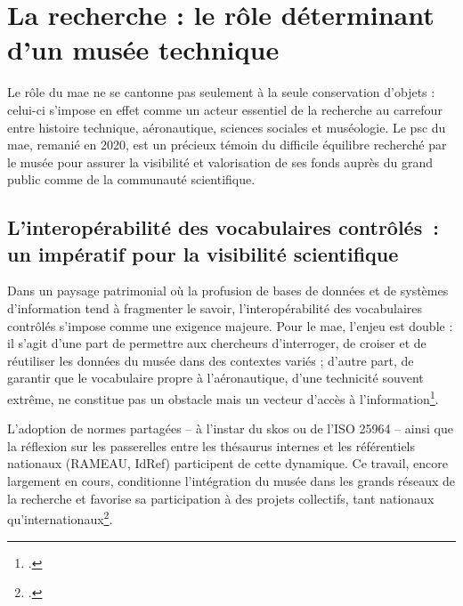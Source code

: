 \section{\label{I-A-2}La recherche : le rôle déterminant d'un musée technique}


%
%
%


Le rôle du \ac{mae} ne se cantonne pas seulement à la seule conservation d’objets : celui-ci s'impose en effet comme un acteur essentiel de la recherche au carrefour entre histoire technique, aéronautique, sciences sociales et muséologie.  Le \ac{psc} du \acf{mae}, remanié en 2020, est un précieux témoin du difficile équilibre recherché par le musée pour assurer la visibilité et valorisation de ses fonds auprès du grand public comme de la communauté scientifique.

\subsection{L’interopérabilité des vocabulaires contrôlés : un impératif pour la visibilité scientifique}

Dans un paysage patrimonial où la profusion de bases de données et de systèmes d’information tend à fragmenter le savoir, l’interopérabilité des vocabulaires contrôlés s’impose comme une exigence majeure. Pour le \ac{mae}, l’enjeu est double : il s’agit d’une part de permettre aux chercheurs d’interroger, de croiser et de réutiliser les données du musée dans des contextes variés ; d’autre part, de garantir que le vocabulaire propre à l’aéronautique, d’une technicité souvent extrême, ne constitue pas un obstacle mais un vecteur d’accès à l’information\footcite{hudonISO25964Pour2012a,chichereauNormesConceptionGestion2007}. 

L’adoption de normes partagées – à l’instar du \ac{skos} ou de l’ISO 25964 – ainsi que la réflexion sur les passerelles entre les thésaurus internes et les référentiels nationaux (RAMEAU, IdRef) participent de cette dynamique. Ce travail, encore largement en cours, conditionne l’intégration du musée dans les grands réseaux de la recherche et favorise sa participation à des projets collectifs, tant nationaux qu’internationaux\footcite{nouvelThesaurusPACTOLSSysteme2019}.

